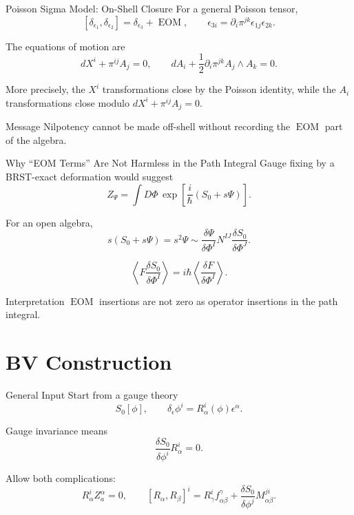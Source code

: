 \documentclass[aspectratio=169,professionalfonts]{beamer}
\newcommand{\EOM}{\ensuremath{\operatorname{EOM}}}
\begin{document}
\begin{frame}{Poisson Sigma Model: On-Shell Closure}
  For a general Poisson tensor,
  \[
    [\delta_{\epsilon_1},\delta_{\epsilon_2}]
    =\delta_{\epsilon_3}+\EOM,
    \qquad
    \epsilon_{3i}
    =\partial_i\pi^{jk}\epsilon_{1j}\epsilon_{2k}.
  \]

  The equations of motion are
  \[
    dX^i+\pi^{ij}A_j=0,
    \qquad
    dA_i+\frac12\partial_i\pi^{jk}A_j\wedge A_k=0 .
  \]

  {\footnotesize
  More precisely, the $X^i$ transformations close by the Poisson identity,
  while the $A_i$ transformations close modulo
  $dX^i+\pi^{ij}A_j=0$.}

  \begin{block}{Message}
    Nilpotency cannot be made off-shell without recording the \EOM{} part of
    the algebra.
  \end{block}
\end{frame}

\begin{frame}{Why ``EOM Terms'' Are Not Harmless in the Path Integral}
  Gauge fixing by a BRST-exact deformation would suggest
  \[
    Z_\Psi=\int D\Phi\,
    \exp\left[\frac{i}{\hbar}(S_0+s\Psi)\right].
  \]

  For an open algebra,
  \[
    s(S_0+s\Psi)=s^2\Psi
    \sim
    \frac{\delta\Psi}{\delta\Phi^I}
    N^{IJ}\frac{\delta S_0}{\delta\Phi^J}.
  \]

  \[
    \left\langle F\frac{\delta S_0}{\delta\Phi^I}\right\rangle
    =i\hbar\left\langle\frac{\delta F}{\delta\Phi^I}\right\rangle .
  \]

  \begin{alertblock}{Interpretation}
    \EOM{} insertions are not zero as operator insertions in the path integral.
  \end{alertblock}
\end{frame}

\section{BV Construction}

\begin{frame}{General Input}
  Start from a gauge theory
  \[
    S_0[\phi],
    \qquad
    \delta_\epsilon\phi^i=R^i_\alpha(\phi)\epsilon^\alpha .
  \]

  Gauge invariance means
  \[
    \frac{\delta S_0}{\delta\phi^i}R^i_\alpha=0 .
  \]

  Allow both complications:
  \[
    R^i_\alpha Z^\alpha_a=0,
    \qquad
    [R_\alpha,R_\beta]^i
    =R^i_\gamma f^\gamma_{\alpha\beta}
    +\frac{\delta S_0}{\delta\phi^j}M^{ji}_{\alpha\beta}.
  \]
\end{frame}
\end{document}

